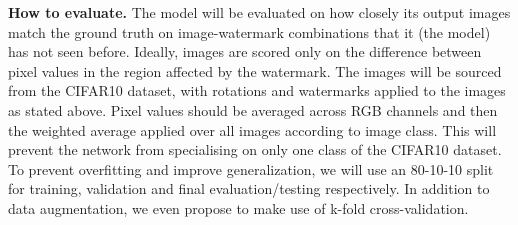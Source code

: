 \documentclass[11pt]{article}
\begin{document}
\begin{sloppypar}
\textbf{How to evaluate.}
The model will be evaluated on how closely its output images match the ground truth on image-watermark combinations that it (the model) has not seen before. Ideally, images are scored only on the difference between pixel values in the region affected by the watermark. The images will be sourced from the CIFAR10 dataset, with rotations and watermarks applied to the images as stated above. Pixel values should be averaged across RGB channels and then the weighted average applied over all images according to image class. This will prevent the network from specialising on only one class of the CIFAR10 dataset.
To prevent overfitting and improve generalization, we will use an 80-10-10 split for training, validation and final evaluation/testing respectively. In addition to data augmentation, we even propose to make use of k-fold cross-validation.
\end{sloppypar}

\newpage



\pagebreak


% 
%
% 

\end{document}
